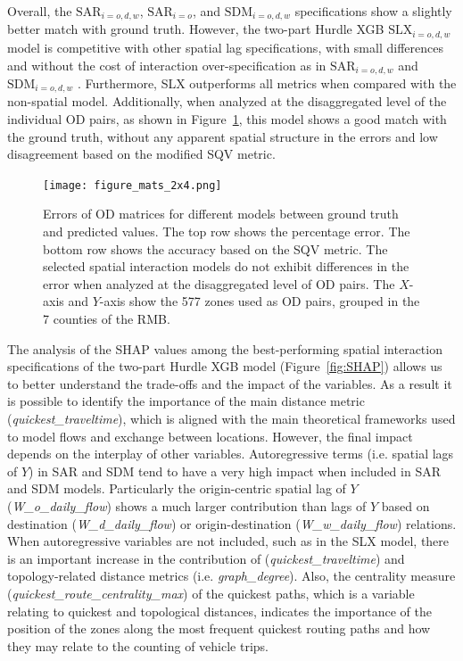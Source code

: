 Overall, the $\text{SAR}_{i=o,d,w}$, $\text{SAR}_{i=o}$, and $\text{SDM}_{i=o,d,w}$ specifications show a slightly better match with ground truth. However, the two-part Hurdle XGB $\text{SLX}_{i=o,d,w}$ model is competitive with other spatial lag specifications, with small differences and without the cost of interaction over-specification as in $\text{SAR}_{i=o,d,w}$ and $\text{SDM}_{i=o,d,w}$ \citep{Griffith2020SomeModels}. 
Furthermore, SLX outperforms all metrics when compared with the non-spatial model. Additionally, when analyzed at the disaggregated level of the individual OD pairs, as shown in Figure~\ref{fig:Hurdle_SLX_matrices}, this model shows a good match with the ground truth, without any apparent spatial structure in the errors and low disagreement based on the modified SQV metric.

\begin{figure}[h!]
    \centering
    \texttt{[image: figure\_mats\_2x4.png]}
    \caption{Errors of OD matrices for different models between ground truth and predicted values. The top row shows the percentage error. The bottom row shows the accuracy based on the SQV metric. The selected spatial interaction models do not exhibit differences in the error when analyzed at the disaggregated level of OD pairs. The $X$-axis and $Y$-axis show the 577 zones used as OD pairs, grouped in the 7 counties of the RMB.}
    \label{fig:Hurdle_SLX_matrices}
\end{figure}

The analysis of the SHAP values \citep{Lundberg2017APredictions} among the best-performing spatial interaction specifications of the two-part Hurdle XGB model (Figure~\ref{fig:SHAP}) allows us to better understand the trade-offs %
and the impact of the variables. As a result it is possible to identify the importance of the main distance metric (\emph{quickest\_traveltime}), which is aligned with the main theoretical frameworks used to model flows and exchange between locations. However, the final impact depends on the interplay of other variables. Autoregressive terms (i.e. spatial lags of $Y$) in SAR and SDM tend to have a very high impact when included in SAR and SDM models. Particularly the origin-centric spatial lag of $Y$ (\emph{W\_o\_daily\_flow}) shows a much larger contribution than lags of $Y$ based on destination (\emph{W\_d\_daily\_flow}) or origin-destination (\emph{W\_w\_daily\_flow}) relations. When autoregressive variables are not included, such as in the SLX model, there is an important increase in the contribution of (\emph{quickest\_traveltime}) and topology-related distance metrics (i.e. \emph{graph\_degree}). Also, the centrality measure  (\emph{quickest\_route\_centrality\_max}) of the quickest paths, which is a variable relating to quickest and topological distances, indicates the importance of the position of the zones along the most frequent quickest routing paths and how they may relate to the counting of vehicle trips.

